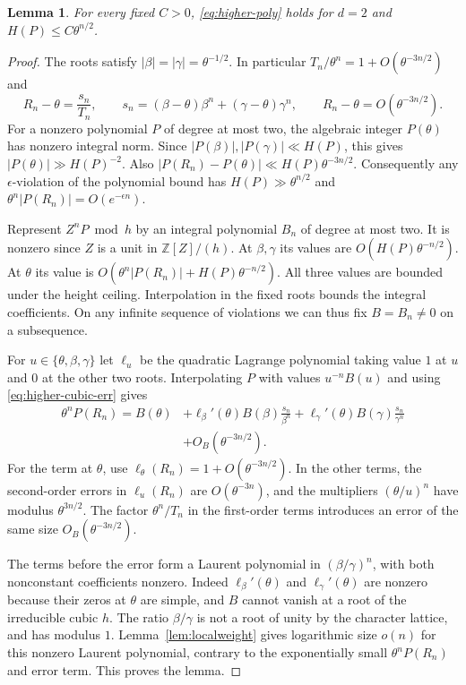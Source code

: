 \documentclass[11pt,a4paper,reqno]{amsart}
\newtheorem{lemma}[theorem]{Lemma}
\theoremstyle{definition}
\theoremstyle{remark}
\numberwithin{equation}{section}
\begin{document}
\begin{lemma}\label{lem:higher-cubic-local}
For every fixed \(C>0\), \eqref{eq:higher-poly} holds for
\(d=2\) and \(H(P)\le C\theta^{n/2}\).
\end{lemma}

\begin{proof}
The roots satisfy \(|\beta|=|\gamma|=\theta^{-1/2}\).
In particular \(T_n/\theta^n=1+O(\theta^{-3n/2})\) and
\begin{equation}\label{eq:higher-cubic-err}
 R_n-\theta=\frac{s_n}{T_n},\qquad
 s_n=(\beta-\theta)\beta^n+(\gamma-\theta)\gamma^n,\qquad
 R_n-\theta=O(\theta^{-3n/2}).
\end{equation}
For a nonzero polynomial \(P\) of degree at most two,
the algebraic integer \(P(\theta)\) has nonzero integral
norm. Since \(|P(\beta)|,|P(\gamma)|\ll H(P)\), this gives
\(|P(\theta)|\gg H(P)^{-2}\). Also
\(\lvert P(R_n)-P(\theta)\rvert\ll H(P)\theta^{-3n/2}\).
Consequently any \(\epsilon\)-violation of the polynomial
bound has \(H(P)\gg\theta^{n/2}\) and
\(\theta^n|P(R_n)|=O(e^{-\epsilon n})\).

Represent \(Z^nP\bmod h\) by an integral polynomial
\(B_n\) of degree at most two. It is nonzero since
\(Z\) is a unit in \(\mathbb Z[Z]/(h)\). At \(\beta,\gamma\)
its values are \(O(H(P)\theta^{-n/2})\). At \(\theta\) its
value is
\(O(\theta^n|P(R_n)|+H(P)\theta^{-n/2})\).
All three values are bounded under the height ceiling.
Interpolation in the fixed roots bounds the integral
coefficients. On any infinite sequence of violations
we can thus fix \(B=B_n\ne0\) on a subsequence.

For \(u\in\{\theta,\beta,\gamma\}\) let \(\ell_u\)
be the quadratic Lagrange polynomial taking value \(1\)
at \(u\) and \(0\) at the other two roots. Interpolating
\(P\) with values \(u^{-n}B(u)\) and using
\eqref{eq:higher-cubic-err} gives
\begin{align*}
 \theta^nP(R_n)
  = B(\theta)
  &+\ell_\beta'(\theta)B(\beta)\frac{s_n}{\beta^n}
   +\ell_\gamma'(\theta)B(\gamma)\frac{s_n}{\gamma^n}\\
  &+O_B(\theta^{-3n/2}).
\end{align*}
For the term at \(\theta\), use
\(\ell_\theta(R_n)=1+O(\theta^{-3n/2})\).
In the other terms, the second-order errors in
\(\ell_u(R_n)\) are \(O(\theta^{-3n})\), and the
multipliers \((\theta/u)^n\) have modulus
\(\theta^{3n/2}\). The factor \(\theta^n/T_n\)
in the first-order terms introduces an error of the
same size \(O_B(\theta^{-3n/2})\).

The terms before the error form a Laurent polynomial
in \((\beta/\gamma)^n\), with both nonconstant
coefficients nonzero. Indeed \(\ell_\beta'(\theta)\)
and \(\ell_\gamma'(\theta)\) are nonzero because their
zeros at \(\theta\) are simple, and \(B\) cannot vanish
at a root of the irreducible cubic \(h\). The ratio
\(\beta/\gamma\) is not a root of unity by the character
lattice, and has modulus \(1\). Lemma~\ref{lem:localweight}
gives logarithmic size \(o(n)\) for this nonzero Laurent
polynomial, contrary to the exponentially small
\(\theta^nP(R_n)\) and error term. This proves the lemma.
\end{proof}
\end{document}
